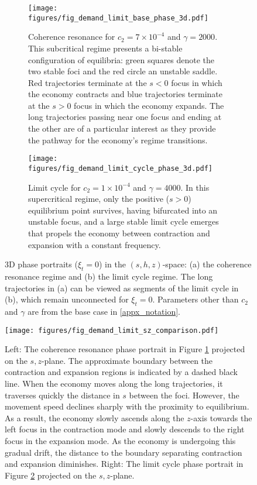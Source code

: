 \documentclass[authoryear, review]{elsarticle}
\begin{document}
\begin{figure}
	\centering
\begin{subfigure}[b]{0.95\textwidth} 
    \centering
	\texttt{[image: figures/fig\_demand\_limit\_base\_phase\_3d.pdf]}
	\caption{Coherence resonance for $c_2=7\times10^{-4}$ and $\gamma=2000$. This subcritical regime presents a bi-stable configuration of equilibria: green squares denote the two stable foci and the red circle an unstable saddle. Red trajectories terminate at the $s<0$ focus in which the economy contracts and blue trajectories terminate at the $s>0$ focus in which the economy expands. The long trajectories passing near one focus and ending at the other are of a particular interest as they provide the pathway for the economy's regime transitions.}
	\label{fig_demand_limit_base_phase_3d}
\end{subfigure}

\begin{subfigure}[b]{0.95\textwidth} 
    \centering 
	\texttt{[image: figures/fig\_demand\_limit\_cycle\_phase\_3d.pdf]}
	\caption{Limit cycle for $c_2=1\times10^{-4}$ and $\gamma=4000$. In this supercritical regime, only the positive ($s>0$) equilibrium point survives, having bifurcated into an unstable focus, and a large stable limit cycle emerges that propels the economy between contraction and expansion with a constant frequency.}
	\label{fig_demand_limit_cycle_phase_3d}
\end{subfigure}

\caption{3D phase portraits ($\xi_t=0$) in the $(s,h,z)$-space: (a) the coherence resonance regime and (b) the limit cycle regime. The long trajectories in (a) can be viewed as segments of the limit cycle in (b), which remain unconnected for $\xi_t=0$. Parameters other than $c_2$ and $\gamma$ are from the base case in \ref{appx_notation}.}
\label{fig_demand_two_phases_3d}
\end{figure}

\begin{figure}
	\centering 
	\texttt{[image: figures/fig\_demand\_limit\_sz\_comparison.pdf]}
	\caption{Left: The coherence resonance phase portrait in Figure \ref{fig_demand_limit_base_phase_3d} projected on the $s,z$-plane. The approximate boundary between the contraction and expansion regions is indicated by a dashed black line. When the economy moves along the long trajectories, it traverses quickly the distance in $s$ between the foci. However, the movement speed declines sharply with the proximity to equilibrium. As a result, the economy slowly ascends along the $z$-axis towards the left focus in the contraction mode and slowly descends to the right focus in the expansion mode. As the economy is undergoing this gradual drift, the distance to the boundary separating contraction and expansion diminishes. Right: The limit cycle phase portrait in Figure \ref{fig_demand_limit_cycle_phase_3d} projected on the $s,z$-plane.} 
	\label{fig_demand_limit_sz_comparison}
\end{figure}
\end{document}

